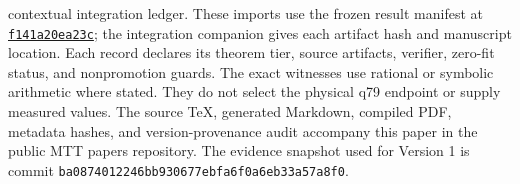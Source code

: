 \documentclass[11pt,a4paper]{article}
\begin{document}
contextual integration ledger. These imports use the frozen result
manifest at
\href{https://github.com/PeterNero/mtt-results-repro/tree/f141a20ea23c5c3ff19cc2161c0e226e29ade8a7/release/results}
{\texttt{f141a20ea23c}}; the integration companion gives each artifact
hash and manuscript location.
Each record declares its theorem tier, source artifacts, verifier, zero-fit
status, and nonpromotion guards.  The exact witnesses use rational or
symbolic arithmetic where stated.  They do not select the physical q79
endpoint or supply measured values.  The source TeX, generated Markdown,
compiled PDF, metadata hashes, and version-provenance audit accompany this
paper in the public MTT papers repository.  The evidence snapshot used for
Version 1 is commit
\texttt{ba0874012246bb930677ebfa6f0a6eb33a57a8f0}.

{\small


}
\end{document}
